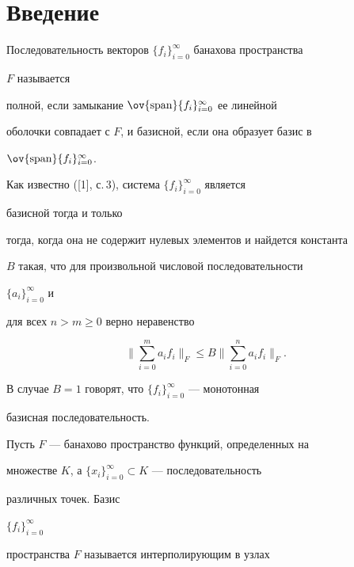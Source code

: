 \maketitle


\label{begin}





\section{Введение}





Последовательность векторов $\{f_i\}^\infty_{i=0}$ банахова пространства


$F$ называется


полной, если замыкание $\ov{\Span}\{f_i\}^\infty_{i=0}$ ее линейной


оболочки совпадает с $F$, и базисной, если она образует базис в


$\ov{\Span}\{f_i\}^\infty_{i=0}$.


Как известно ([1], с.\,3), система $\{f_i\}^\infty_{i=0}$ является


базисной тогда и только


тогда, когда она не содержит нулевых элементов и найдется константа


$B$ такая, что для произвольной числовой последовательности


$\{a_i\}^\infty_{i=0}$ и


для всех $n>m\ge 0$ верно неравенство


$$


\biggl\|\sum^m_{i=0}a_i f_i \biggr\|_F\le B


\biggl\|\sum^n_{i=0}a_i f_i \biggr\|_F.


$$


В случае $B=1$ говорят, что $\{f_i\}^\infty_{i=0}$ --- монотонная


базисная последовательность.





Пусть $F$ --- банахово пространство функций, определенных на


множестве $K$, а $\{x_i\}^\infty_{i=0}\subset K$ --- последовательность


различных точек. Базис


$\{f_i\}^\infty_{i=0}$


пространства $F$ называется интерполирующим в узлах


